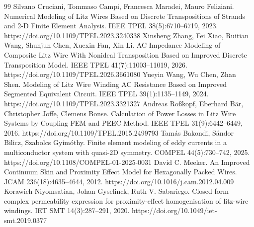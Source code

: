 \documentclass[journal,10pt]{IEEEtran}
\begin{document}
\clearpage
\begin{thebibliography}{99}
 Silvano Cruciani, Tommaso Campi, Francesca Maradei, Mauro Feliziani. Numerical Modeling of Litz Wires Based on Discrete Transpositions of Strands and 2-D Finite Element Analysis. IEEE TPEL 38(5):6710–6719, 2023. https://doi.org/10.1109/TPEL.2023.3240338
 Xinsheng Zhang, Fei Xiao, Ruitian Wang, Shunjun Chen, Xuexin Fan, Xin Li. AC Impedance Modeling of Composite Litz Wire With Nonideal Transposition Based on Improved Discrete Transposition Model. IEEE TPEL 41(7):11003–11019, 2026. https://doi.org/10.1109/TPEL.2026.3661080
 Yueyin Wang, Wu Chen, Zhan Shen. Modeling of Litz Wire Winding AC Resistance Based on Improved Segmented Equivalent Circuit. IEEE TPEL 39(1):1135–1149, 2024. https://doi.org/10.1109/TPEL.2023.3321327
 Andreas Roßkopf, Eberhard Bär, Christopher Joffe, Clemens Bonse. Calculation of Power Losses in Litz Wire Systems by Coupling FEM and PEEC Method. IEEE TPEL 31(9):6442–6449, 2016. https://doi.org/10.1109/TPEL.2015.2499793
 Tamás Bakondi, Sándor Bilicz, Szabolcs Gyimóthy. Finite element modeling of eddy currents in a multiconductor system with quasi-2D symmetry. COMPEL 44(5):730–742, 2025. https://doi.org/10.1108/COMPEL-01-2025-0031
 David C. Meeker. An Improved Continuum Skin and Proximity Effect Model for Hexagonally Packed Wires. JCAM 236(18):4635–4644, 2012. https://doi.org/10.1016/j.cam.2012.04.009
 Korawich Niyomsatian, Johan Gyselinck, Ruth V. Sabariego. Closed-form complex permeability expression for proximity-effect homogenisation of litz-wire windings. IET SMT 14(3):287–291, 2020. https://doi.org/10.1049/iet-smt.2019.0377
\end{thebibliography}
\end{document}

